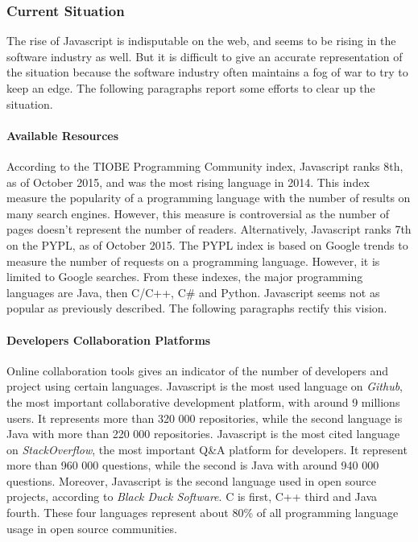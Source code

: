 \subsubsection{Current Situation}

The rise of Javascript is indisputable on the web, and seems to be rising in the software industry as well.
But it is difficult to give an accurate representation of the situation because the software industry often maintains a fog of war to try to keep an edge.
The following paragraphs report some efforts to clear up the situation.

\paragraph{Available Resources}

According to the TIOBE Programming Community index, Javascript ranks 8th, as of October 2015, and was the most rising language in 2014.
This index measure the popularity of a programming language with the number of results on many search engines.
However, this measure is controversial as the number of pages doesn't represent the number of readers.
Alternatively, Javascript ranks 7th on the PYPL, as of October 2015.
The PYPL index is based on Google trends to measure the number of requests on a programming language.
However, it is limited to Google searches.
From these indexes, the major programming languages are Java, then C/C++, C\# and Python.
Javascript seems not as popular as previously described.
The following paragraphs rectify this vision.


\paragraph{Developers Collaboration Platforms}

Online collaboration tools gives an indicator of the number of developers and project using certain languages.
Javascript is the most used language on \textit{Github}, the most important collaborative development platform, with around 9 millions users.
It represents more than 320 000 repositories, while the second language is Java with more than 220 000 repositories.
Javascript is the most cited language on \textit{StackOverflow}, the most important Q\&A platform for developers.
It represent more than 960 000 questions, while the second is Java with around 940 000 questions.
Moreover, Javascript is the second language used in open source projects, according to \textit{Black Duck Software}.
C is first, C++ third and Java fourth.
These four languages represent about 80\% of all programming language usage in open source communities.

